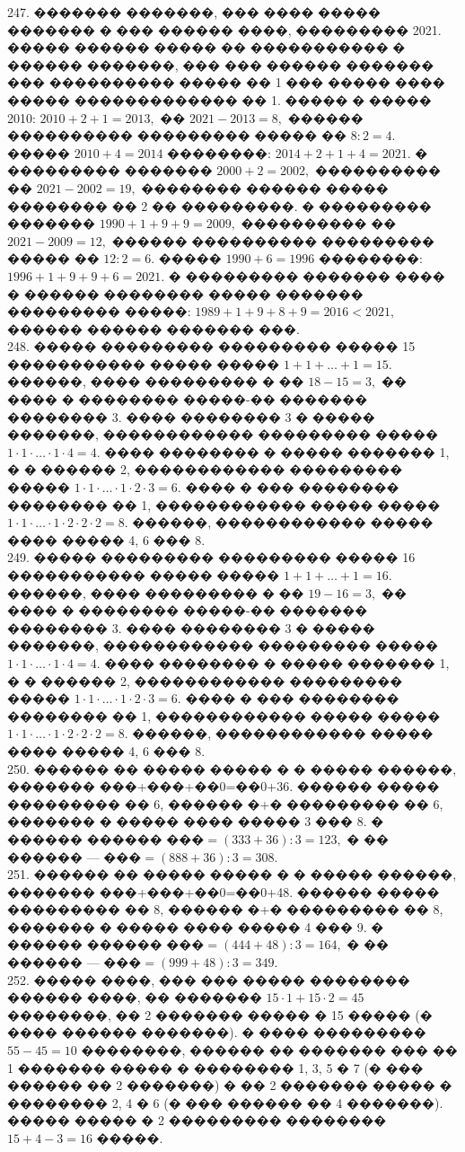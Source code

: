\documentclass[12pt]{article}
\begin{document}
247. ������� �������, ��� ���� ����� ������� � ��� ������ ����, ��������� 2021. ����� ������ ����� �� ����������� � ������ �������, ��� ��� ������ ������� ��� ���������� ����� �� 1 ��� ����� ���� ����� ������������� �� 1. ����� � ����� 2010: $2010+2+1=2013,$ �� $2021-2013=8,$ ������ ���������� ��������� ����� �� $8:2=4.$ ����� $2010+4=2014$ ��������: $2014+2+1+4=2021.$ � ��������� ������� $2000+2=2002,$ ���������� �� $2021-2002=19,$ �������� ������ ����� �������� �� 2 �� ���������. � ��������� ������� $1990+1+9+9=2009,$ ���������� �� $2021-2009=12,$ ������ ���������� ��������� ����� �� $12:2=6.$ ����� $1990+6=1996$ ��������: $1996+1+9+9+6=2021.$ � ��������� ������� ���� � ������ �������� ����� ������� ��������� �����: $1989+1+9+8+9=2016<2021,$ ������ ������ ������� ���.\\
248. ����� ��������� ��������� ����� 15 ����������� ����� ����� $1+1+\ldots+1=15.$ ������, ���� ��������� � �� $18-15=3,$ �� ���� � �������� �����-�� ������� �������� 3. ���� �������� 3 � ����� �������, ������������ ��������� ����� $1\cdot1\cdot\ldots\cdot1\cdot4=4.$ ���� �������� � ����� ������� 1, � � ������ 2, ������������ ��������� ����� $1\cdot1\cdot\ldots\cdot1\cdot2\cdot3=6.$ ���� � ��� �������� �������� �� 1, ������������ ����� ����� $1\cdot1\cdot\ldots\cdot1\cdot2\cdot2\cdot2=8.$ ������, ������������ ����� ���� ����� 4, 6 ��� 8.\\
249. ����� ��������� ��������� ����� 16 ����������� ����� ����� $1+1+\ldots+1=16.$ ������, ���� ��������� � �� $19-16=3,$ �� ���� � �������� �����-�� ������� �������� 3. ���� �������� 3 � ����� �������, ������������ ��������� ����� $1\cdot1\cdot\ldots\cdot1\cdot4=4.$ ���� �������� � ����� ������� 1, � � ������ 2, ������������ ��������� ����� $1\cdot1\cdot\ldots\cdot1\cdot2\cdot3=6.$ ���� � ��� �������� �������� �� 1, ������������ ����� ����� $1\cdot1\cdot\ldots\cdot1\cdot2\cdot2\cdot2=8.$ ������, ������������ ����� ���� ����� 4, 6 ��� 8.\\
250. ������ �� ����� ����� � � ����� ������, ������� ���+���+��0=��0+36. ������ ����� ��������� �� 6, ������ �+� ��������� �� 6, ������� � ����� ���� ����� 3 ��� 8. � ������ ������ ���$=(333+36):3=123,$ � �� ������ --- ���$=(888+36):3=308.$\\
251. ������ �� ����� ����� � � ����� ������, ������� ���+���+��0=��0+48. ������ ����� ��������� �� 8, ������ �+� ��������� �� 8, ������� � ����� ���� ����� 4 ��� 9. � ������ ������ ���$=(444+48):3=164,$ � �� ������ --- ���$=(999+48):3=349.$\\
252. ����� ����, ��� ��� ����� �������� ������ ����, �� ������� $15\cdot1+15\cdot2=45$ ��������, �� 2 ������� ����� � 15 ����� (� ���� ������ �������). � ���� ��������� $55-45=10$ ��������, ������ �� ������� ��� �� 1 ������� ����� � �������� 1, 3, 5 � 7 (� ��� ������ �� 2 �������) � �� 2 ������� ����� � �������� 2, 4 � 6 (� ��� ������ �� 4 �������). ����� ����� � 2 ��������� �������� $15+4-3=16$ �����.\\
\end{document}
